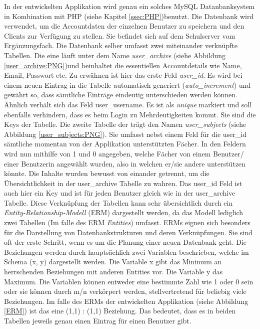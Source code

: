 \documentclass[a4paper,11pt]{report}
\begin{document}
				In der entwickelten Applikation wird genau ein solches MySQL Datanbanksystem in Kombination mit PHP (siehe Kapitel \ref{ssec:PHP})benutzt. Die Datenbank wird verwendet, um die Accountdaten der einzelnen Benutzer zu speichern und den Clients zur Verfügung zu stellen. Sie befindet sich auf dem Schulserver vom Ergänzungsfach. Die Datenbank selber umfasst zwei miteinander verknüpfte Tabellen. Die eine läuft unter dem Name \emph{user\_archive} (siehe Abbildung \ref{user_archive:PNG})und beinhaltet die essentiellen Accountdetails wie Name, Email, Passwort etc. Zu erwähnen ist hier das erste Feld \emph{user\_id}. Es wird bei einem neuen Eintrag in die Tabelle automatisch generiert (\emph{auto\_increment}) und gewährt so, dass sämtliche Einträge eindeutig unterschieden werden können. Ähnlich verhält sich das Feld user\_username. Es ist als \emph{unique} markiert und soll ebenfalls verhindern, dass es beim Login zu Mehrdeutigkeiten kommt. Sie sind die Keys der Tabelle. Die zweite Tabelle der trägt den Namen \emph{user\_subjects} (siehe Abbildung \ref{user_subjects:PNG}). Sie umfasst nebst einem Feld für die user\_id sämtliche momentan von der Applikation unterstützten Fächer. In den Feldern wird nun mithilfe von 1 und 0 angegeben, welche Fächer von einem Benutzer/ einer Benutzerin angewählt wurden, also in welchen er/sie andere unterstützen könnte. Die Inhalte wurden bewusst von einander getrennt, um die Übersichtlichkeit in der user\_archive Tabelle zu wahren. Das user\_id Feld ist auch hier ein Key und ist für jeden Benutzer gleich wie in der user\_archive Tabelle. Diese Verknüpfung der Tabellen kann sehr übersichtlich durch ein \emph{Entity-Relationship-Modell} (ERM) dargestellt werden, da das Modell lediglich zwei Tabellen (Im falle des ERM \emph{Entities}) umfasst. ERMs eignen sich besonders für die Darstellung von Datenbankstrukturen und deren Verknüpfungen. Sie sind oft der erste Schritt, wenn es um die Planung einer neuen Datenbank geht. Die Beziehungen werden durch hauptsächlich zwei Variablen beschrieben, welche im Schema (x, y) dargestellt werden. Die Variable x gibt das Minimum an herrschenden Beziehungen mit anderen Entities vor. Die Variable y das Maximum. Die Variablen können entweder eine bestimmte Zahl wie 1 oder 0 sein oder sie können durch m/n verkörpert werden, stellvertretend für beliebig viele Beziehungen. Im falle des ERMs der entwickelten Applikation (siehe Abbildung \ref{ERM}) ist das eine (1,1) : (1,1) Beziehung. Das bedeutet, dass es in beiden Tabellen jeweils genau einen Eintrag für einen Benutzer gibt. \cite[S. 750]{IT-Handbuch}\cite{ERM}\cite{ERM2}
\end{document}
